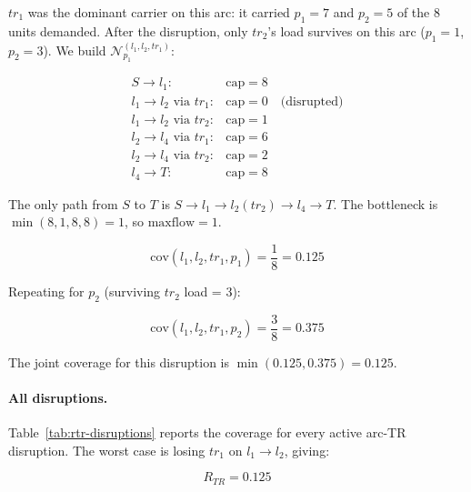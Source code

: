 \documentclass{article}
\begin{document}
$tr_1$ was the dominant carrier on this arc: it carried
$p_1 = 7$ and $p_2 = 5$ of the 8 units demanded. After the
disruption, only $tr_2$'s load survives on this arc ($p_1=1$,
$p_2=3$). We build $\mathcal{N}_{p_1}^{(l_1,l_2,tr_1)}$:

\[
\begin{array}{ll}
S \to l_1: & \mathrm{cap} = 8 \\
l_1 \to l_2 \text{ via } tr_1: & \mathrm{cap} = 0
    \quad \text{(disrupted)}\\
l_1 \to l_2 \text{ via } tr_2: & \mathrm{cap} = 1 \\
l_2 \to l_4 \text{ via } tr_1: & \mathrm{cap} = 6 \\
l_2 \to l_4 \text{ via } tr_2: & \mathrm{cap} = 2 \\
l_4 \to T: & \mathrm{cap} = 8
\end{array}
\]

The only path from $S$ to $T$ is $S \to l_1 \to l_2
(tr_2) \to l_4 \to T$. The bottleneck is
$\min(8, 1, 8, 8) = 1$, so $\mathrm{maxflow} = 1$.

\[
    \mathrm{cov}(l_1, l_2, tr_1, p_1) = \frac{1}{8} = 0.125
\]

Repeating for $p_2$ (surviving $tr_2$ load = 3):

\[
    \mathrm{cov}(l_1, l_2, tr_1, p_2) = \frac{3}{8} = 0.375
\]

The joint coverage for this disruption is
$\min(0.125, 0.375) = 0.125$.

\paragraph{All disruptions.}

Table~\ref{tab:rtr-disruptions} reports the coverage for every
active arc-TR disruption. The worst case is losing $tr_1$ on
$l_1 \to l_2$, giving:

\[
    R_{TR} = 0.125
\]
\end{document}
